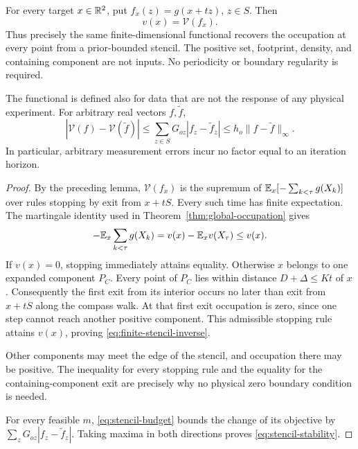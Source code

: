\begin{theorem}
\label{thm:finite-stencil}
For every target $x\in\mathbb R^2$, put $f_x(z)=g(x+tz)$, $z\in S$.
Then
\begin{equation}\label{eq:finite-stencil-inverse}
                         v(x)=\mathcal V(f_x).
\end{equation}
Thus precisely the same finite-dimensional functional recovers the
occupation at every point from a prior-bounded stencil. The positive
set, footprint, density, and containing component are not inputs.
No periodicity or boundary regularity is required.

The functional is defined also for data that are not the response of
any physical experiment. For arbitrary real vectors $f,\widetilde f$,
\begin{equation}\label{eq:stencil-stability}
 |\mathcal V(f)-\mathcal V(\widetilde f)|
 \le\sum_{z\in S}G_{oz}|f_z-\widetilde f_z|
 \le h_o\|f-\widetilde f\|_\infty.
\end{equation}
In particular, arbitrary measurement errors incur no factor equal to
an iteration horizon.
\end{theorem}
\begin{proof}
By the preceding lemma, $\mathcal V(f_x)$ is the supremum of
$\mathbb E_x[-\sum_{k<\tau}g(X_k)]$ over rules stopping by exit from
$x+tS$. Every such time has finite expectation. The martingale
identity used in Theorem~\ref{thm:global-occupation} gives
\[
 -\mathbb E_x\sum_{k<\tau}g(X_k)
                  =v(x)-\mathbb E_xv(X_\tau)\le v(x).
\]
If $v(x)=0$, stopping immediately attains equality. Otherwise $x$
belongs to one expanded component $P_C$. Every point of $P_C$ lies
within distance $D+\Delta\le Kt$ of $x$. Consequently the first exit
from its interior occurs no later than exit from $x+tS$ along the
compass walk. At that first exit occupation is zero, since one step
cannot reach another positive component. This admissible stopping rule
attains $v(x)$, proving \eqref{eq:finite-stencil-inverse}.

Other components may meet the edge of the stencil, and occupation
there may be positive. The inequality for every stopping rule and
the equality for the containing-component exit are precisely why no
physical zero boundary condition is needed.

For every feasible $m$, \eqref{eq:stencil-budget} bounds the change
of its objective by $\sum_zG_{oz}|f_z-\widetilde f_z|$. Taking maxima
in both directions proves \eqref{eq:stencil-stability}.
\end{proof}

